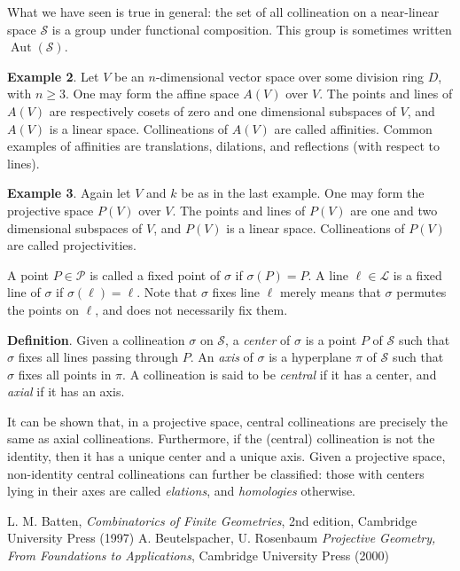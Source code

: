 \documentclass[12pt]{article}
\begin{document}
What we have seen is true in general: the set of all collineation on a near-linear space $\mathscr{S}$ is a group under functional composition.  This group is sometimes written $\operatorname{Aut}(\mathscr{S})$.

\textbf{Example 2}.  Let $V$ be an $n$-dimensional vector space over some division ring $D$, with $n\ge 3$.  One may form the affine space $A(V)$ over $V$.  The points and lines of $A(V)$ are respectively cosets of zero and one dimensional subspaces of $V$, and $A(V)$ is a linear space.  Collineations of $A(V)$ are called affinities.  Common examples of affinities are translations, dilations, and reflections (with respect to lines).

\textbf{Example 3}.  Again let $V$ and $k$ be as in the last example.  One may form the projective space $P(V)$ over $V$.  The points and lines of $P(V)$ are one and two dimensional subspaces of $V$, and $P(V)$ is a linear space.  Collineations of $P(V)$ are called projectivities.

A point $P\in \mathcal{P}$ is called a fixed point of $\sigma$ if $\sigma(P)=P$.  A line $\ell \in \mathcal{L}$ is a fixed line of $\sigma$ if $\sigma(\ell)=\ell$.  Note that $\sigma$ fixes line $\ell$ merely means that $\sigma$ permutes the points on $\ell$, and does not necessarily fix them.

\textbf{Definition}.  Given a collineation $\sigma$ on $\mathscr{S}$, a \emph{center} of $\sigma$ is a point $P$ of $\mathscr{S}$ such that $\sigma$ fixes all lines passing through $P$.  An \emph{axis} of $\sigma$ is a hyperplane $\pi$ of $\mathscr{S}$ such that $\sigma$ fixes all points in $\pi$.  A collineation is said to be \emph{central} if it has a center, and \emph{axial} if it has an axis.

It can be shown that, in a projective space, central collineations are precisely the same as axial collineations.  Furthermore, if the (central) collineation is not the identity, then it has a unique center and a unique axis.  Given a projective space, non-identity central collineations can further be classified: those with centers lying in their axes are called \emph{elations}, and \emph{homologies} otherwise.

\begin{thebibliography}{7}
 L. M. Batten, {\it Combinatorics of Finite Geometries}, 2nd edition, Cambridge University Press (1997)
 A. Beutelspacher, U. Rosenbaum {\it Projective Geometry, From Foundations to Applications}, Cambridge University Press (2000)
\end{thebibliography}
\end{document}
